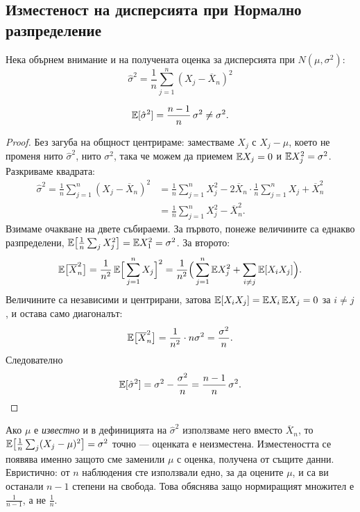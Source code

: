\subsection{Изместеност на дисперсията при Нормално разпределение}

Нека обърнем внимание и на получената оценка за дисперсията при $N(\mu, \sigma^2)$:
\[
    \hat{\sigma}^2 = \frac{1}{n} \sum_{j=1}^n \left(X_j - \overline{X}_n\right)^2
\]
\begin{prop}\label{prop:sigma-bias}
\[ \mathbb{E}[\hat{\sigma}^2] = \frac{n-1}{n}\,\sigma^2 \neq \sigma^2 . \]
\end{prop}

\begin{proof}
Без загуба на общност центрираме: заместваме $X_j$ с $X_j - \mu$, което не променя нито
$\hat{\sigma}^2$, нито $\sigma^2$, така че можем да приемем $\mathbb{E} X_j = 0$ и
$\mathbb{E} X_j^2 = \sigma^2$. Разкриваме квадрата:
\begin{align*}
\hat{\sigma}^2 = \frac1n \sum_{j=1}^n \left(X_j - \overline{X}_n\right)^2
  &= \frac1n \sum_{j=1}^n X_j^2 - 2\overline{X}_n \cdot \frac1n\sum_{j=1}^n X_j + \overline{X}_n^2 \\
  &= \frac1n \sum_{j=1}^n X_j^2 - \overline{X}_n^2 .
\end{align*}
Взимаме очакване на двете събираеми. За първото, понеже величините са еднакво разпределени,
$\mathbb{E}\big[\frac1n\sum_j X_j^2\big] = \mathbb{E} X_1^2 = \sigma^2$. За второто:
\[
\mathbb{E}\big[\overline{X}_n^2\big]
  = \frac{1}{n^2}\,\mathbb{E}\Big[\sum_{j=1}^n X_j\Big]^2
  = \frac{1}{n^2}\Big( \sum_{j=1}^n \mathbb{E} X_j^2 + \sum_{i \neq j} \mathbb{E}[X_i X_j] \Big) .
\]
Величините са независими и центрирани, затова $\mathbb{E}[X_i X_j] = \mathbb{E} X_i \, \mathbb{E} X_j = 0$ за
$i \neq j$, и остава само диагоналът:
\[
\mathbb{E}\big[\overline{X}_n^2\big] = \frac{1}{n^2} \cdot n\sigma^2 = \frac{\sigma^2}{n} .
\]
Следователно
\[
\mathbb{E}[\hat{\sigma}^2] = \sigma^2 - \frac{\sigma^2}{n} = \frac{n-1}{n}\,\sigma^2 .
\]
\end{proof}

\begin{remark}\label{rem:dof}
Ако $\mu$ е \emph{известно} и в дефиницията на $\hat{\sigma}^2$ използваме него вместо
$\overline{X}_n$, то $\mathbb{E}\big[\frac1n\sum_j (X_j-\mu)^2\big] = \sigma^2$ точно — оценката е
неизместена. Изместеността се появява именно защото сме заменили $\mu$ с оценка, получена
от същите данни. Евристично: от $n$ наблюдения сте използвали едно, за да оцените $\mu$, и
са ви останали $n-1$ степени на свобода. Това обяснява защо нормиращият множител е
$\frac{1}{n-1}$, а не $\frac1n$.
\end{remark}


